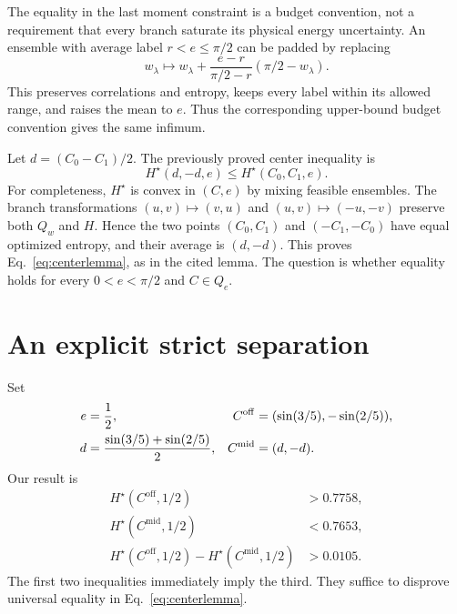 \documentclass[aps,pra,reprint,amsmath,amssymb,longbibliography,nofootinbib]{revtex4-2}
\newcommand{\Hs}{H^{\star}}
\newcommand{\Coff}{C^{\mathrm{off}}}
\newcommand{\Cmid}{C^{\mathrm{mid}}}
\begin{document}
The equality in the last moment constraint is a budget convention, not a
requirement that every branch saturate its physical energy uncertainty.
An ensemble with average label $r<e\leq\pi/2$ can be padded by replacing
\begin{equation}
 w_\lambda\longmapsto w_\lambda+
 \frac{e-r}{\pi/2-r}(\pi/2-w_\lambda).
 \label{eq:padding}
\end{equation}
This preserves correlations and entropy, keeps every label within its
allowed range, and raises the mean to $e$. Thus the corresponding upper-bound
budget convention gives the same infimum.

Let $d=(C_0-C_1)/2$. The previously proved center inequality is
\begin{equation}
 \Hs(d,-d,e)\leq\Hs(C_0,C_1,e).
 \label{eq:centerlemma}
\end{equation}
For completeness, $\Hs$ is convex in $(C,e)$ by mixing feasible ensembles.
The branch transformations $(u,v)\mapsto(v,u)$ and $(u,v)\mapsto(-u,-v)$
preserve both $Q_w$ and $H$. Hence the two points $(C_0,C_1)$ and
$(-C_1,-C_0)$ have equal optimized entropy, and their average is $(d,-d)$.
This proves Eq.~\eqref{eq:centerlemma}, as in the cited lemma. The question
is whether equality holds for every $0<e<\pi/2$ and $C\in Q_e$.

\section{An explicit strict separation}\label{sec:result}

Set
\begin{align}
 e&=\frac12,&
 \Coff&=(\sin(3/5),-\sin(2/5)),\notag\\
 d&=\frac{\sin(3/5)+\sin(2/5)}{2},&
 \Cmid&=(d,-d).
 \label{eq:points}
\end{align}
Our result is
\begin{align}
 \Hs(\Coff,1/2)&>0.7758,\label{eq:offbound}\\
 \Hs(\Cmid,1/2)&<0.7653,\label{eq:midbound}\\
 \Hs(\Coff,1/2)-\Hs(\Cmid,1/2)&>0.0105.
 \label{eq:gap}
\end{align}
The first two inequalities immediately imply the third. They suffice to
disprove universal equality in Eq.~\eqref{eq:centerlemma}.
\end{document}
